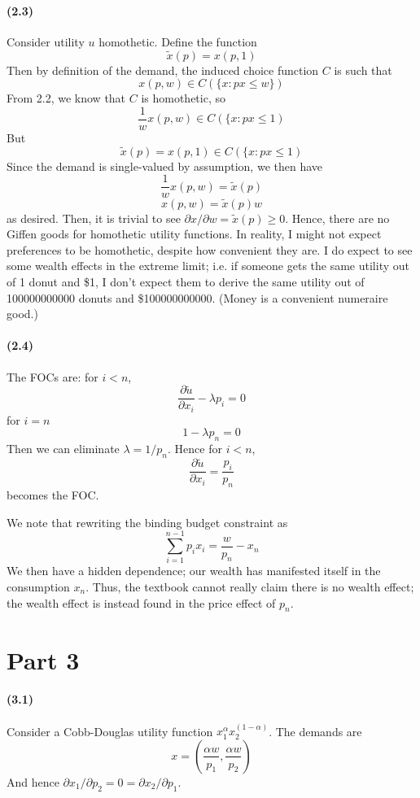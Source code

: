 \documentclass[10pt,letter]{article}
\begin{document}
\paragraph{(2.3)}
Consider utility $u$ homothetic. Define the function
\[ \tilde{x}(p) = x(p,1) \]
Then by definition of the demand, the induced choice function $C$ is such that
\[ x(p,w) \in C(\{ x : px \le w\}) \]
From 2.2, we know that $C$ is homothetic, so
\[ \frac{1}{w}x(p,w) \in C(\{ x: px \le 1) \]
But
\[ \tilde{x}(p) = x(p,1) \in C(\{ x: px \le 1) \]
Since the demand is single-valued by assumption, we then have
\[\frac{1}{w}x(p,w) = \tilde{x}(p) \]
\[ x(p,w) =\tilde{x}(p) w \]
as desired. Then, it is trivial to see $\partial x / \partial w = \tilde{x}(p) \ge 0$. Hence, there are no Giffen goods for homothetic utility functions. In reality, I might not expect preferences to be homothetic, despite how convenient they are. I do expect to see some wealth effects in the extreme limit; i.e. if someone gets the same utility out of 1 donut and \$1, I don't expect them to derive the same utility out of 100000000000 donuts and \$100000000000. (Money is a convenient numeraire good.)
\paragraph{(2.4)}
The FOCs are: for $i < n$,
\[ \frac{\partial \tilde{u}}{\partial x_i} - \lambda p_i = 0 \]
for $i = n$
\[ 1- \lambda p_n = 0 \]
Then we can eliminate $\lambda = 1/p_n$. Hence for $i < n$,
\[ \frac{\partial \tilde{u}}{\partial x_i} = \frac{p_i}{p_n} \]
becomes the FOC.

We note that rewriting the binding budget constraint as
\[ \sum_{i=1}^{n-1} p_ix_i = \frac{w}{p_n} - x_n \]
We then have a hidden dependence; our wealth has manifested itself in the consumption $x_n$. Thus, the textbook cannot really claim there is no wealth effect; the wealth effect is instead found in the price effect of $p_n$.

\pagebreak
\section*{Part 3}
\paragraph{(3.1)}
Consider a Cobb-Douglas utility function $x_1^\alpha x_2^{(1-\alpha)}$. The demands are
\[ x = \left( \frac{\alpha w}{p_1}, \frac{\alpha w}{p_2} \right) \]
And hence $\partial x_1 / \partial p_2 = 0 = \partial x_2 / \partial p_1$.
\end{document}
